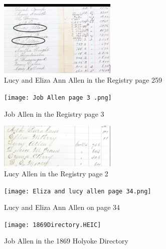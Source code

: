 \documentclass[
  letterpaper,
  DIV=11,
  numbers=noendperiod]{scrartcl}
\begin{document}
\begin{figure}

{\centering \includegraphics[width=0.5\textwidth,height=\textheight]{Mary and Eliza Allen.jpeg}

}

\caption{\label{fig-sample4}Lucy and Eliza Ann Allen in the Registry
page 259}

\end{figure}

\begin{figure}

{\centering \texttt{[image: Job Allen page 3 .png]}

}

\caption{\label{fig-sample7}Job Allen in the Registry page 3}

\end{figure}

\begin{figure}

{\centering \includegraphics[width=0.5\textwidth,height=\textheight]{Lucypg2.jpeg}

}

\caption{\label{fig-sample9}Lucy Allen in the Registry page 2}

\end{figure}

\begin{figure}

{\centering \texttt{[image: Eliza and lucy allen page 34.png]}

}

\caption{\label{fig-sample10}Lucy and Eliza Ann Allen on page 34}

\end{figure}

\begin{figure}

{\centering \texttt{[image: 1869Directory.HEIC]}

}

\caption{\label{fig-sample11}Job Allen in the 1869 Holyoke Directory}

\end{figure}
\end{document}
